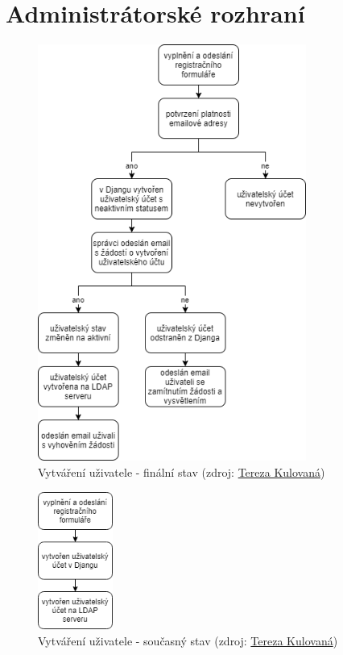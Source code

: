 \chapter{Administrátorské rozhraní}
\label{4-praxe}

\begin{figure}[H] \centering
    \includegraphics[width=250pt]{./pictures/my_console_final_version_cz.png}
    \caption[Vytváření uživatele - finální stav]{Vytváření uživatele - finální stav (zdroj:
	\href{}{Tereza Kulovaná})}
    \label{fig:admin-final}
  \end{figure}

\begin{figure}[H] \centering
    \includegraphics[width=70pt]{./pictures/my_console_current_version_cz.png}
    \caption[Vytváření uživatele - současný stav]{Vytváření uživatele - současný stav (zdroj:
	\href{}{Tereza Kulovaná})}
    \label{fig:admin-current}
  \end{figure}


